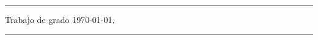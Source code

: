 \mbox{}
\vfill

{\small\onehalfspacing
\begin{center}

\noindent\rule{\textwidth}{1pt} %

    Trabajo de grado \today.

\noindent\rule{\textwidth}{.2pt} %

    


\end{center}
} %